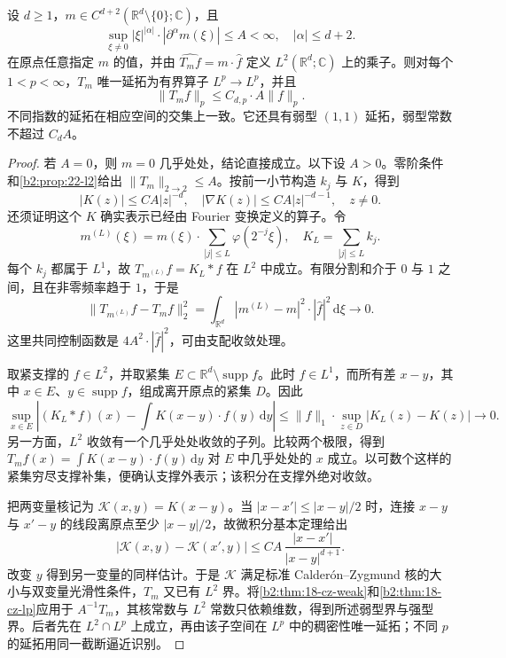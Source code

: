 \begin{theorem}\label{b2:thm:22-mihlin}
设 \(d\geq1\)，\(m\in C^{d+2}(\mathbb R^d\setminus\{0\};\mathbb C)\)，且
\[
 \sup_{\xi\ne0}|\xi|^{|\alpha|}\cdot|\partial^\alpha m(\xi)|
 \leq A<\infty,\quad |\alpha|\leq d+2.
\]
在原点任意指定 \(m\) 的值，并由
\(\widehat{T_mf}=m\cdot\widehat f\) 定义 \(L^2(\mathbb R^d;\mathbb C)\) 上的乘子。则对每个 \(1<p<\infty\)，\(T_m\) 唯一延拓为有界算子 \(L^p\to L^p\)，并且
\[
 \|T_mf\|_p\leq C_{d,p}\cdot A\|f\|_p.
\]
不同指数的延拓在相应空间的交集上一致。它还具有弱型 \((1,1)\) 延拓，弱型常数不超过 \(C_dA\)。
\end{theorem}
\begin{proof}
若 \(A=0\)，则 \(m=0\) 几乎处处，结论直接成立。以下设 \(A>0\)。零阶条件和\cref{b2:prop:22-l2}给出 \(\|T_m\|_{2\to2}\leq A\)。按前一小节构造 \(k_j\) 与 \(K\)，得到
\[
 |K(z)|\leq C A|z|^{-d},
 \quad |\nabla K(z)|\leq C A|z|^{-d-1},
 \quad z\ne0.
\]
还须证明这个 \(K\) 确实表示已经由 Fourier 变换定义的算子。令
\[
 m^{(L)}(\xi)=m(\xi)\cdot
 \sum_{|j|\leq L}\varphi(2^{-j}\xi),
 \quad K_L=\sum_{|j|\leq L}k_j.
\]
每个 \(k_j\) 都属于 \(L^1\)，故 \(T_{m^{(L)}}f=K_L*f\) 在 \(L^2\) 中成立。有限分割和介于 \(0\) 与 \(1\) 之间，且在非零频率趋于 \(1\)，于是
\[
 \|T_{m^{(L)}}f-T_mf\|_2^2
 =\int_{\mathbb R^d}|m^{(L)}-m|^2\cdot|\widehat f|^2
 \,\mathrm d\xi\longrightarrow0.
\]
这里共同控制函数是 \(4A^2\cdot|\widehat f|^2\)，可由支配收敛处理。

取紧支撑的 \(f\in L^2\)，并取紧集 \(E\subset\mathbb R^d\setminus\operatorname{supp}f\)。此时 \(f\in L^1\)，而所有差 \(x-y\)，其中 \(x\in E\)、\(y\in\operatorname{supp}f\)，组成离开原点的紧集 \(D\)。因此
\[
 \sup_{x\in E}\left|
 (K_L*f)(x)-\int K(x-y)\cdot f(y)\,\mathrm dy
 \right|
 \leq\|f\|_1\cdot\sup_{z\in D}|K_L(z)-K(z)|
 \longrightarrow0.
\]
另一方面，\(L^2\) 收敛有一个几乎处处收敛的子列。比较两个极限，得到 \(T_mf(x)=\int K(x-y)\cdot f(y)\,\mathrm dy\) 对 \(E\) 中几乎处处的 \(x\) 成立。以可数个这样的紧集穷尽支撑补集，便确认支撑外表示；该积分在支撑外绝对收敛。

把两变量核记为 \(\mathcal K(x,y)=K(x-y)\)。当 \(|x-x'|\leq|x-y|/2\) 时，连接 \(x-y\) 与 \(x'-y\) 的线段离原点至少 \(|x-y|/2\)，故微积分基本定理给出
\[
 |\mathcal K(x,y)-\mathcal K(x',y)|
 \leq C A\,\frac{|x-x'|}{|x-y|^{d+1}}.
\]
改变 \(y\) 得到另一变量的同样估计。于是 \(\mathcal K\) 满足标准 Calderón--Zygmund 核的大小与双变量光滑性条件，\(T_m\) 又已有 \(L^2\) 界。将\cref{b2:thm:18-cz-weak}和\cref{b2:thm:18-cz-lp}应用于 \(A^{-1}T_m\)，其核常数与 \(L^2\) 常数只依赖维数，得到所述弱型界与强型界。后者先在 \(L^2\cap L^p\) 上成立，再由该子空间在 \(L^p\) 中的稠密性唯一延拓；不同 \(p\) 的延拓用同一截断逼近识别。
\end{proof}

